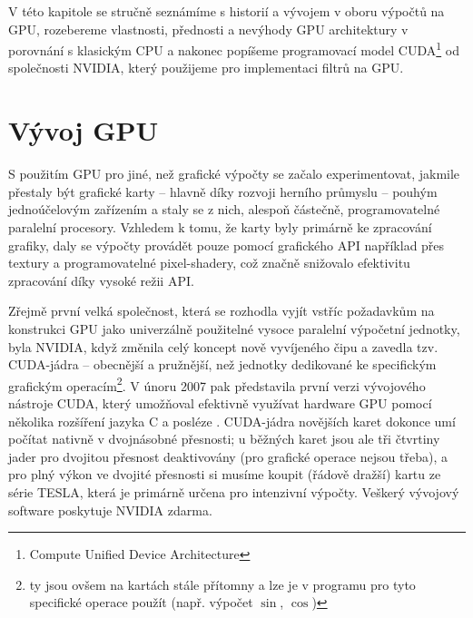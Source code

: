 






V této kapitole se stručně seznámíme s historií a vývojem v oboru výpočtů na GPU, rozebereme vlastnosti, přednosti a nevýhody GPU architektury v porovnání s klasickým CPU a nakonec popíšeme programovací model CUDA\footnote{Compute Unified Device Architecture} od společnosti NVIDIA, který použijeme pro implementaci filtrů na GPU.

\section{Vývoj GPU}

    S použitím GPU pro jiné, než grafické výpočty se začalo experimentovat, jakmile přestaly být grafické karty -- hlavně díky rozvoji herního průmyslu -- pouhým jednoúčelovým zařízením a staly se z nich, alespoň částečně, programovatelné paralelní procesory. Vzhledem k tomu, že karty byly primárně ke zpracování grafiky, daly se výpočty provádět pouze pomocí grafického API například přes textury a programovatelné pixel-shadery, což značně snižovalo efektivitu zpracování díky vysoké režii API.

    Zřejmě první velká společnost, která se rozhodla vyjít vstříc požadavkům na konstrukci GPU jako univerzálně použitelné vysoce paralelní výpočetní jednotky, byla NVIDIA, když změnila celý koncept nově vyvíjeného čipu a zavedla tzv. CUDA-jádra -- obecnější a pružnější, než jednotky dedikované ke specifickým grafickým operacím\footnote{ty jsou ovšem na kartách stále přítomny a lze je v programu pro tyto specifické operace použít (např. výpočet $\sin$, $\cos$)}. V únoru 2007 pak představila první verzi vývojového nástroje CUDA, který umožňoval efektivně využívat hardware GPU pomocí několika rozšíření jazyka C a posléze \Cpp. CUDA-jádra novějších karet dokonce umí počítat nativně v dvojnásobné přesnosti; u běžných karet jsou ale tři čtvrtiny jader pro dvojitou přesnost deaktivovány \cite{Heller} (pro grafické operace nejsou třeba), a pro plný výkon ve dvojité přesnosti si musíme koupit (řádově dražší) kartu ze série TESLA, která je primárně určena pro intenzivní výpočty. Veškerý vývojový software poskytuje NVIDIA zdarma.

